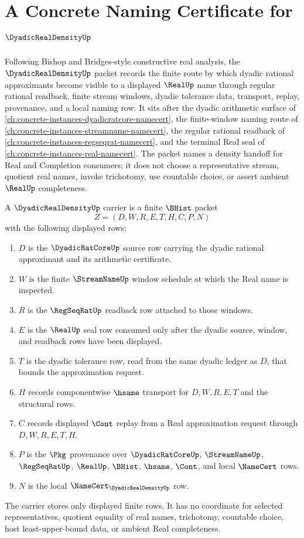 \chapter{A Concrete Naming Certificate for $\DyadicRealDensityUp$}
\label{ch:concrete-instances-dyadic-real-density-namecert}

Following Bishop and Bridges-style constructive real analysis, the $\DyadicRealDensityUp$ packet records the finite route by which dyadic rational approximants become visible to a displayed $\RealUp$ name through regular rational readback, finite stream windows, dyadic tolerance data, transport, replay, provenance, and a local naming row. It sits after the dyadic arithmetic surface of \autoref{ch:concrete-instances-dyadicratcore-namecert}, the finite-window naming route of \autoref{ch:concrete-instances-streamname-namecert}, the regular rational readback of \autoref{ch:concrete-instances-regseqrat-namecert}, and the terminal Real seal of \autoref{ch:concrete-instances-real-namecert}. The packet names a density handoff for Real and Completion consumers; it does not choose a representative stream, quotient real names, invoke trichotomy, use countable choice, or assert ambient $\RealUp$ completeness.

\begin{definition}
\label{def:dyadic-real-density-carrier}
A $\DyadicRealDensityUp$ carrier is a finite $\BHist$ packet
$$
Z=(D,W,R,E,T,H,C,P,N)
$$
with the following displayed rows:
\begin{enumerate}
\item $D$ is the $\DyadicRatCoreUp$ source row carrying the dyadic rational approximant and its arithmetic certificate.
\item $W$ is the finite $\StreamNameUp$ window schedule at which the Real name is inspected.
\item $R$ is the $\RegSeqRatUp$ readback row attached to those windows.
\item $E$ is the $\RealUp$ seal row consumed only after the dyadic source, window, and readback rows have been displayed.
\item $T$ is the dyadic tolerance row, read from the same dyadic ledger as $D$, that bounds the approximation request.
\item $H$ records componentwise $\hsame$ transport for $D,W,R,E,T$ and the structural rows.
\item $C$ records displayed $\Cont$ replay from a Real approximation request through $D,W,R,E,T,H$.
\item $P$ is the $\Pkg$ provenance over $\DyadicRatCoreUp$, $\StreamNameUp$, $\RegSeqRatUp$, $\RealUp$, $\BHist$, $\hsame$, $\Cont$, and local $\NameCert$ rows.
\item $N$ is the local $\NameCert_{\DyadicRealDensityUp}$ row.
\end{enumerate}
The carrier stores only displayed finite rows. It has no coordinate for selected representatives, quotient equality of real names, trichotomy, countable choice, host least-upper-bound data, or ambient Real completeness.
\end{definition}

